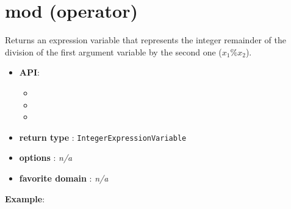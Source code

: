 
\section{mod (operator)}\label{mod:modoperator}\hypertarget{mod:modoperator}{}
Returns an expression variable that represents the integer remainder of the division of the first argument variable by the second one (\(x_1\%x_2\)).

\begin{itemize}
	\item \textbf{API}:
	\begin{itemize}
		\item {}
		\item {}
		\item {}
	\end{itemize}
	\item \textbf{return type} : \texttt{IntegerExpressionVariable}
	\item \textbf{options} : \emph{n/a}
	\item \textbf{favorite domain} : \emph{n/a}
\end{itemize}

\textbf{Example}:


